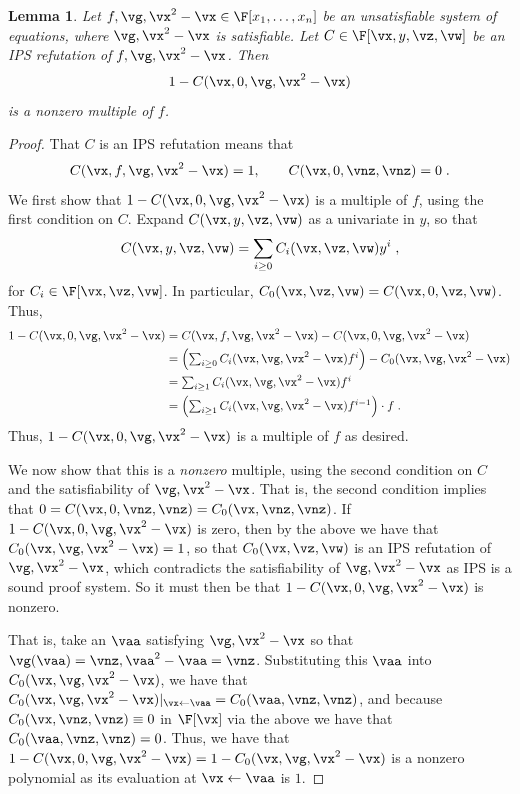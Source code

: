 \documentclass[11pt]{article}
\numberwithin{equation}{section}
\newtheorem{lemma}[theorem]{Lemma}
\theoremstyle{definition}
\theoremstyle{plain}
\begin{document}
\begin{lemma}\label{res:lbs-mult:strategy}
        Let $f,\vg,\vx^2-\vx\in\F[x_1,\ldots,x_n]$ be an unsatisfiable system of equations, where $\vg,\vx^2-\vx$ is satisfiable.  Let $C\in\F[\vx,y,\vz,\vw]$ be an IPS refutation of $f,\vg,\vx^2-\vx$.  Then
        \[
                1-C(\vx,0,\vg,\vx^2-\vx)
        \]
        is a nonzero multiple of $f$.
\end{lemma}
\begin{proof}
        That $C$ is an IPS refutation means that
        \[
                C(\vx,f,\vg,\vx^2-\vx)=1,\qquad
                C(\vx,0,\vnz,\vnz)=0
                \;.
        \]
        We first show that $1-C(\vx,0,\vg,\vx^2-\vx)$ is a multiple of $f$, using the first condition on $C$. Expand $C(\vx,y,\vz,\vw)$ as a univariate in $y$, so that
        \[
                C(\vx,y,\vz,\vw)=\sum_{i\ge 0} C_i(\vx,\vz,\vw)y^i
                \;,
        \]
        for $C_i\in\F[\vx,\vz,\vw]$. In particular, $C_0(\vx,\vz,\vw)=C(\vx,0,\vz,\vw)$. Thus,
        \begin{align*}
                1-C(\vx,0,\vg,\vx^2-\vx)
                &=C(\vx,f,\vg,\vx^2-\vx)-C(\vx,0,\vg,\vx^2-\vx)\\
                &=\textstyle\left(\sum_{i\ge 0} C_i(\vx,\vg,\vx^2-\vx)f^i\right)-C_0(\vx,\vg,\vx^2-\vx)\\
                &=\textstyle\sum_{i\ge 1} C_i(\vx,\vg,\vx^2-\vx)f^i\\
                &=\textstyle\left(\sum_{i\ge 1} C_i(\vx,\vg,\vx^2-\vx)f^{i-1}\right)\cdot f
                \;.
        \end{align*}
        Thus, $1-C(\vx,0,\vg,\vx^2-\vx)$ is a multiple of $f$ as desired.

        We now show that this is a \emph{nonzero} multiple, using the second condition on $C$ and the satisfiability of $\vg,\vx^2-\vx$.  That is, the second condition implies that $0=C(\vx,0,\vnz,\vnz)=C_0(\vx,\vnz,\vnz)$.  If $1-C(\vx,0,\vg,\vx^2-\vx)$ is zero, then by the above we have that $C_0(\vx,\vg,\vx^2-\vx)=1$, so that $C_0(\vx,\vz,\vw)$ is an IPS refutation of $\vg,\vx^2-\vx$, which contradicts the satisfiability of $\vg,\vx^2-\vx$ as IPS is a sound proof system.  So it must then be that $1-C(\vx,0,\vg,\vx^2-\vx)$ is nonzero.

        That is, take an $\vaa$ satisfying $\vg,\vx^2-\vx$ so that $\vg(\vaa)=\vnz,\vaa^2-\vaa=\vnz$. Substituting this $\vaa$ into $C_0(\vx,\vg,\vx^2-\vx)$, we have that $C_0(\vx,\vg,\vx^2-\vx)|_{\vx\leftarrow\vaa}=C_0(\vaa,\vnz,\vnz)$, and because $C_0(\vx,\vnz,\vnz)\equiv0$ in $\F[\vx]$ via the above we have that $C_0(\vaa,\vnz,\vnz)=0$. Thus, we have that $1-C(\vx,0,\vg,\vx^2-\vx)=1-C_0(\vx,\vg,\vx^2-\vx)$ is a nonzero polynomial as its evaluation at $\vx\leftarrow\vaa$ is $1$.
\end{proof}
\end{document}
